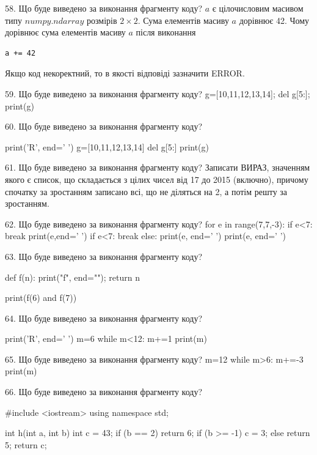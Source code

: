 \documentclass[11pt]{article}
\begin{document}
58. Що буде виведено за виконання фрагменту коду?
$a$ є цілочисловим масивом типу $numpy.ndarray$ розмірів $2{\times}2$. Сума елементів масиву $a$ дорівнює 42. Чому дорівнює сума елементів масиву $a$ після виконання 
\begin{verbatim}
a += 42
\end{verbatim}


Якщо код некоректний, то в якості відповіді зазначити ERROR.




59. Що буде виведено за виконання фрагменту коду?
g=[10,11,12,13,14]; del g[5:]; print(g)

60. Що буде виведено за виконання фрагменту коду?

print('R', end=' ')
g=[10,11,12,13,14]
del g[5:]
print(g)



61. Що буде виведено за виконання фрагменту коду?
Записати ВИРАЗ, значенням якого є список, що складається з цілих чисел від 17 до 2015 (включно), причому спочатку за зростанням записано всі, що не діляться на 2, а потім решту за зростанням.

62. Що буде виведено за виконання фрагменту коду?
for e in range(7,7,-3):
    if e<7:
        break
        print(e,end=' ')
    if e<7:
        break
else:
    print(e, end=' ')
print(e, end=' ')


63. Що буде виведено за виконання фрагменту коду?

def f(n):
    print("f", end="");
    return n

print(f(6) and f(7))


64. Що буде виведено за виконання фрагменту коду?

print('R', end=' ')
m=6
while m<12:
    m+=1
print(m)



65. Що буде виведено за виконання фрагменту коду?
m=12
   while m>6: m+=-3
   print(m)

66. Що буде виведено за виконання фрагменту коду?

#include <iostream>
using namespace std;

int h(int a, int b){
    int c = 43;
    if (b == 2)
        return 6;
    if (b >= -1)
         c = 3;
    else 
        return 5;
    return c;
}
\end{document}
